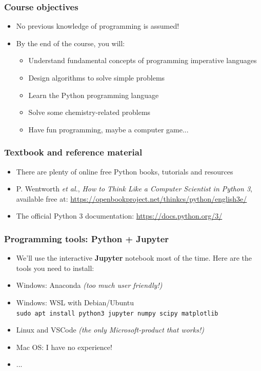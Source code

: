 \documentclass[handout]{beamer}
\begin{document}
\begin{frame}[fragile]
  \frametitle{Course objectives}
  \begin{itemize}
  \item No previous knowledge of programming is assumed!\pause
  \item By the end of the course, you will:\pause
        \begin{itemize}
        \item Understand fundamental concepts of programming imperative languages
        \item Design algorithms to solve simple problems
        \item Learn the Python programming language
        \item Solve some chemistry-related problems
        \item Have fun programming, maybe a computer game...
        \end{itemize}
  \end{itemize}
\end{frame}

\begin{frame}[fragile]
  \frametitle{Textbook and reference material}
  \begin{itemize}
  \item There are plenty of online free Python books, tutorials and resources
  \item P. Wentworth \emph{et al.}, \emph{How to Think Like a Computer Scientist in Python 3}, 
        available free at: \url{https://openbookproject.net/thinkcs/python/english3e/}
  \item The official Python 3 documentation: \url{https://docs.python.org/3/}
  \end{itemize}
\end{frame}

\begin{frame}[fragile]
  \frametitle{Programming tools: Python + Jupyter}
  \begin{itemize}
  \item We'll use the interactive \textbf{Jupyter} notebook most of the time. Here are the tools you need to install:\pause
  \item Windows: Anaconda \textsl{\small{(too much user friendly!)}}\pause
  \item Windows: WSL with Debian/Ubuntu\\
       \verb|sudo apt install python3 jupyter numpy scipy matplotlib|
  \item Linux and VSCode \textsl{\small{(the only Microsoft-product that works!)}}\pause
  \item Mac OS: I have no experience!\pause
  \item ...
  \end{itemize}
\end{frame}
\end{document}

